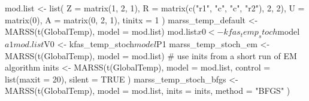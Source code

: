 \begin{Schunk}
\begin{Sinput}
 mod.list <- list(
   Z = matrix(1, 2, 1),
   R = matrix(c("r1", "c", "c", "r2"), 2, 2),
   U = matrix(0),
   A = matrix(0, 2, 1),
   tinitx = 1
 )
 marss_temp_default <- MARSS(t(GlobalTemp), model = mod.list)
 mod.list$x0 <- kfas_temp_stoch$model$a1
 mod.list$V0 <- kfas_temp_stoch$model$P1
 marss_temp_stoch_em <- MARSS(t(GlobalTemp), model = mod.list)
 # use inits from a short run of EM algorithm
 inits <- MARSS(t(GlobalTemp),
   model = mod.list, control = list(maxit = 20),
   silent = TRUE
 )
 marss_temp_stoch_bfgs <- MARSS(t(GlobalTemp),
   model = mod.list,
   inits = inits, method = "BFGS"
 )
\end{Sinput}
\end{Schunk}
